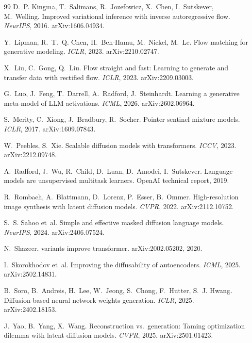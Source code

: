 \documentclass[11pt]{article}
\begin{document}
\begin{thebibliography}{99}
D.~P. Kingma, T.~Salimans, R.~Jozefowicz, X.~Chen, I.~Sutskever, M.~Welling.
\newblock Improved variational inference with inverse autoregressive flow.
\newblock \emph{NeurIPS}, 2016. arXiv:1606.04934.

Y.~Lipman, R.~T.~Q. Chen, H.~Ben-Hamu, M.~Nickel, M.~Le.
\newblock Flow matching for generative modeling.
\newblock \emph{ICLR}, 2023. arXiv:2210.02747.

X.~Liu, C.~Gong, Q.~Liu.
\newblock Flow straight and fast: Learning to generate and transfer data with rectified flow.
\newblock \emph{ICLR}, 2023. arXiv:2209.03003.

G.~Luo, J.~Feng, T.~Darrell, A.~Radford, J.~Steinhardt.
\newblock Learning a generative meta-model of {LLM} activations.
\newblock \emph{ICML}, 2026. arXiv:2602.06964.

S.~Merity, C.~Xiong, J.~Bradbury, R.~Socher.
\newblock Pointer sentinel mixture models.
\newblock \emph{ICLR}, 2017. arXiv:1609.07843.

W.~Peebles, S.~Xie.
\newblock Scalable diffusion models with transformers.
\newblock \emph{ICCV}, 2023. arXiv:2212.09748.

A.~Radford, J.~Wu, R.~Child, D.~Luan, D.~Amodei, I.~Sutskever.
\newblock Language models are unsupervised multitask learners.
\newblock OpenAI technical report, 2019.

R.~Rombach, A.~Blattmann, D.~Lorenz, P.~Esser, B.~Ommer.
\newblock High-resolution image synthesis with latent diffusion models.
\newblock \emph{CVPR}, 2022. arXiv:2112.10752.

S.~S. Sahoo et~al.
\newblock Simple and effective masked diffusion language models.
\newblock \emph{NeurIPS}, 2024. arXiv:2406.07524.

N.~Shazeer.
 variants improve transformer.
\newblock arXiv:2002.05202, 2020.

I.~Skorokhodov et~al.
\newblock Improving the diffusability of autoencoders.
\newblock \emph{ICML}, 2025. arXiv:2502.14831.

B.~Soro, B.~Andreis, H.~Lee, W.~Jeong, S.~Chong, F.~Hutter, S.~J. Hwang.
\newblock Diffusion-based neural network weights generation.
\newblock \emph{ICLR}, 2025. arXiv:2402.18153.

J.~Yao, B.~Yang, X.~Wang.
\newblock Reconstruction vs.\ generation: Taming optimization dilemma with latent diffusion models.
\newblock \emph{CVPR}, 2025. arXiv:2501.01423.

\end{thebibliography}
\end{document}
